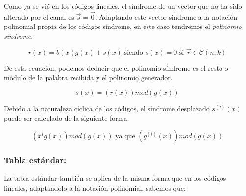 \documentclass{article}
\begin{document}
\begin{center}
\end{center}

Como ya se vió en los códigos lineales, el síndrome de un vector que no ha sido alterado por el canal es $\vec{s} = \vec{0}$. Adaptando este vector síndrome a la notación polinomial propia de los códigos síndrome, en este caso tendremos el \textit{polinomio síndrome}.

\begin{equation}
    r(x) = b(x)g(x) + s(x) \text{ siendo } s(x) = 0 \text{ si } \vec{r}\in\mathcal{C}(n,k) 
\end{equation}

De esta ecuación, podemos deducir que el polinomio síndrome es el resto o módulo de la palabra recibida y el polinomio generador.

\begin{equation}
    s(x) = (r(x))mod(g(x))
\end{equation}

Debido a la naturaleza cíclica de los códigos, el síndrome desplazado $s^(i)(x)$ puede ser calculado de la siguiente forma:

\begin{equation}
    (x^ig(x))mod(g(x)) \text{ ya que } (g^(i)(x))mod(g(x))
\end{equation}

\pagebreak

\subsubsection{Tabla estándar:}

La tabla estándar también se aplica de la misma forma que en los códigos lineales, adaptándolo a la notación polinomial, sabemos que:
\end{document}

